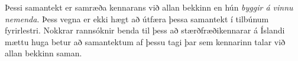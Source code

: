 \documentclass[
  icelandic,
]{book}
\begin{document}
Þessi samantekt er samræða kennarans við allan bekkinn en hún \emph{byggir á vinnu nemenda}. Þess vegna er ekki hægt að útfæra þessa samantekt í tilbúnum fyrirlestri. Nokkrar rannsóknir benda til þess að stærðfræðikennarar á Íslandi mættu huga betur að samantektum af þessu tagi \autocite{oskarsdottir2014} \autocite{savola2008} þar sem kennarinn talar við allan bekkinn saman.

\printbibliography
\end{document}
